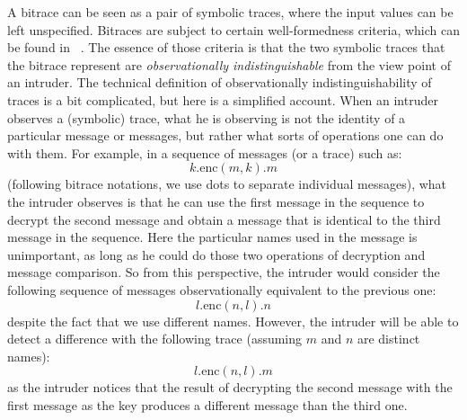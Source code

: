 \documentclass{article}
\begin{document}
A bitrace can be seen as a pair of symbolic traces, where the input values can be left unspecified. 
Bitraces are subject to certain well-formedness criteria, which can be found in ~\cite{tiu09corr}. 
The essence of those criteria is that the two symbolic traces that the bitrace represent are
{\em observationally indistinguishable} from the view point of an intruder.
The technical definition of observationally indistinguishability of traces is a bit complicated,
but here is a simplified account. When an intruder observes a (symbolic) trace, what he is observing
is not the identity of a particular message or messages, but rather what sorts of operations
one can do with them. For example, in a sequence of messages (or a trace) such as:
$$k . \mathrm{enc}(m, k) . m$$
(following bitrace notations, we use dots to separate individual messages), what
the intruder observes is that he can use the first message in the sequence to
decrypt the second message and obtain a message that is identical to the third message
in the sequence. Here the particular names used in the 
message is unimportant, as long as he could do those two operations of decryption and
message comparison. So from this perspective, the intruder would consider the following
sequence of messages observationally equivalent to the previous one:
$$l . \mathrm{enc}(n, l) . n$$
despite the fact that we use different names. However, the intruder will be able to detect
a difference with the following trace (assuming $m$ and $n$ are distinct names):
$$l . \mathrm{enc}(n, l) . m$$
as the intruder notices that the result of decrypting the second message with the first
message as the key produces a different message than the third one.
\end{document}
